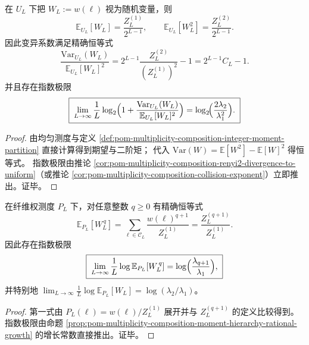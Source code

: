 \begin{corollary}[均匀分解下多重度的方差爆炸率]\label{cor:pom-multiplicity-composition-uniform-variance-explosion}
在 \(U_L\) 下把 \(W_L:=w(\boldsymbol{\ell})\) 视为随机变量，则
\[
\mathbb{E}_{U_L}[W_L]=\frac{Z_L^{(1)}}{2^{L-1}},
\qquad
\mathbb{E}_{U_L}[W_L^2]=\frac{Z_L^{(2)}}{2^{L-1}}.
\]
因此变异系数满足精确恒等式
\[
\boxed{\;
\frac{\mathrm{Var}_{U_L}(W_L)}{\mathbb{E}_{U_L}[W_L]^2}
=2^{L-1}\frac{Z_L^{(2)}}{(Z_L^{(1)})^2}-1
=2^{L-1}C_L-1.\;}
\]
并且存在指数极限
\[
\boxed{\;
\lim_{L\to\infty}\frac{1}{L}\log_2\Bigl(1+\frac{\mathrm{Var}_{U_L}(W_L)}{\mathbb{E}_{U_L}[W_L]^2}\Bigr)
=\log_2\!\Bigl(\frac{2\lambda_2}{\lambda_1^2}\Bigr).\;}
\]
\end{corollary}
\begin{proof}
由均匀测度与定义 \ref{def:pom-multiplicity-composition-integer-moment-partition} 直接计算得到期望与二阶矩；
代入 \(\mathrm{Var}(W)=\mathbb{E}[W^2]-\mathbb{E}[W]^2\) 得恒等式。
指数极限由推论 \ref{cor:pom-multiplicity-composition-renyi2-divergence-to-uniform}（或推论 \ref{cor:pom-multiplicity-composition-collision-exponent}）立即推出。证毕。
\end{proof}

\begin{proposition}[纤维权测度下的矩移位律]\label{prop:pom-multiplicity-composition-moment-shift-law}
在纤维权测度 \(P_L\) 下，对任意整数 \(q\ge 0\) 有精确恒等式
\[
\boxed{\;
\mathbb{E}_{P_L}[W_L^{\,q}]
=\sum_{\boldsymbol{\ell}\in\mathcal{C}_L}\frac{w(\boldsymbol{\ell})^{q+1}}{Z_L^{(1)}}
=\frac{Z_L^{(q+1)}}{Z_L^{(1)}}.\;}
\]
因此存在指数极限
\[
\boxed{\;
\lim_{L\to\infty}\frac{1}{L}\log \mathbb{E}_{P_L}[W_L^{\,q}]
=\log\Bigl(\frac{\lambda_{q+1}}{\lambda_1}\Bigr),\;}
\]
并特别地
\(
\lim_{L\to\infty}\frac{1}{L}\log \mathbb{E}_{P_L}[W_L]=\log(\lambda_2/\lambda_1)
\)。
\end{proposition}
\begin{proof}
第一式由 \(P_L(\boldsymbol{\ell})=w(\boldsymbol{\ell})/Z_L^{(1)}\) 展开并与 \(Z_L^{(q+1)}\) 的定义比较得到。
指数极限由命题 \ref{prop:pom-multiplicity-composition-moment-hierarchy-rational-growth} 的增长常数直接推出。证毕。
\end{proof}

